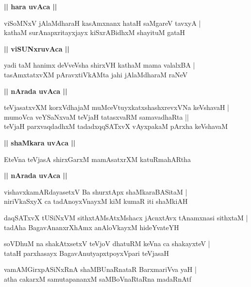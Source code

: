 \documentclass[twoside,12pt,openright]{book}
\newcounter{shloka}[chapter]
\def\uvaca#1{\centerline{{\large\textbf{#1}}}}
\begin{document}
\uvaca{|| hara uvAca ||}

\begin{shloka}%
viSoMNxV jAlaMdharaH kasAmxnanx hataH saMgareV tavxyA |\\
kathaM surAnapxritayxjayx kiSxrABidhxM shayituM gataH
\end{shloka}

\uvaca{|| viSUNxruvAca ||}

\begin{shloka}%
yadi taM hanimx deVveVsha shirxVH kathaM mama valalxBA |\\
tasAmxtatxvXM pAravxtiVkAMta jahi jAlaMdharaM raNeV
\end{shloka}

\uvaca{|| nArada uvAca ||}

\begin{shloka}%
teVjasatxvXM korxVdhajaM muMceVtuyxkatxshashxrevxVNa keVshavaH |\\
mumoVca veYSaNxvaM teVjaH tatasxvaRM samavadhaRta ||\\
teVjaH parxvaqdadhxM tadadxqqSATxvX vAyxpakaM pArxha keVshavaM 
\end{shloka}

\uvaca{|| shaMkara uvAca ||}

\begin{shloka}%
EteVna teVjasA shirxGarxM mamAsatxrXM katuRmahARtha
\end{shloka}

\uvaca{|| nArada uvAca ||}

\begin{shloka}%
vishavxkamARdayasetxV Ba shurxtApx shaMkaraBASitaM |\\
niriVkaSxyX ca tadAnoyxVnayxM kiM kumaR iti shaMkiAH 
\end{shloka}

\begin{shloka}%
daqSATxvX tUSiNxVM sithxtAMsAtxMshacx jAcnxtAvx tAnamxnasi sithxtaM |\\
tadAha BagavAnanxrXhAmx anAloVkayxM hideYvateYH 
\end{shloka}

\begin{shloka}%
soVDhuM na shakAtxsetxV teVjoV dhatuRM keVna ca shakayxteV |\\
tataH parxhasayx BagavAnutyapxtpoyxVpari teVjasaH 
\end{shloka}

\begin{shloka}%
vamAMGirxpASiNxRnA shaMBUnaRnataR BarxmariVva yaH |\\
atha cakarxM samutapananxM saMBoVnaRtaRna madaRnAtf 
\end{shloka}
\end{document}
